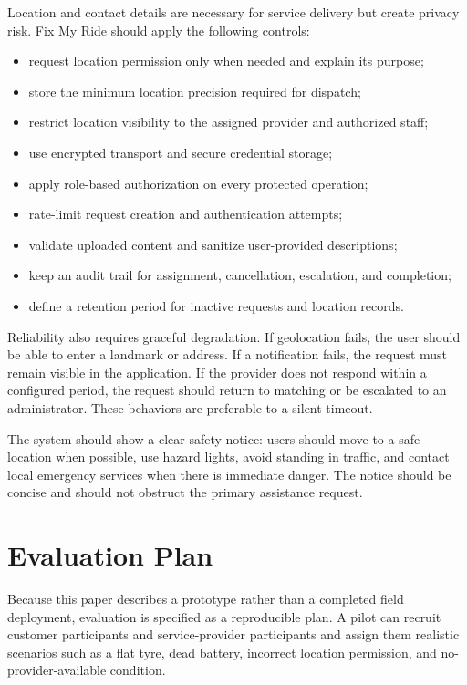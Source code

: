 \documentclass[conference]{IEEEtran}
\begin{document}
Location and contact details are necessary for service delivery but create privacy risk. Fix My Ride should apply the following controls:
\begin{itemize}
    \item request location permission only when needed and explain its purpose;
    \item store the minimum location precision required for dispatch;
    \item restrict location visibility to the assigned provider and authorized staff;
    \item use encrypted transport and secure credential storage;
    \item apply role-based authorization on every protected operation;
    \item rate-limit request creation and authentication attempts;
    \item validate uploaded content and sanitize user-provided descriptions;
    \item keep an audit trail for assignment, cancellation, escalation, and completion;
    \item define a retention period for inactive requests and location records.
\end{itemize}

Reliability also requires graceful degradation. If geolocation fails, the user should be able to enter a landmark or address. If a notification fails, the request must remain visible in the application. If the provider does not respond within a configured period, the request should return to matching or be escalated to an administrator. These behaviors are preferable to a silent timeout.

The system should show a clear safety notice: users should move to a safe location when possible, use hazard lights, avoid standing in traffic, and contact local emergency services when there is immediate danger. The notice should be concise and should not obstruct the primary assistance request.

\section{Evaluation Plan}

Because this paper describes a prototype rather than a completed field deployment, evaluation is specified as a reproducible plan. A pilot can recruit customer participants and service-provider participants and assign them realistic scenarios such as a flat tyre, dead battery, incorrect location permission, and no-provider-available condition.
\end{document}
